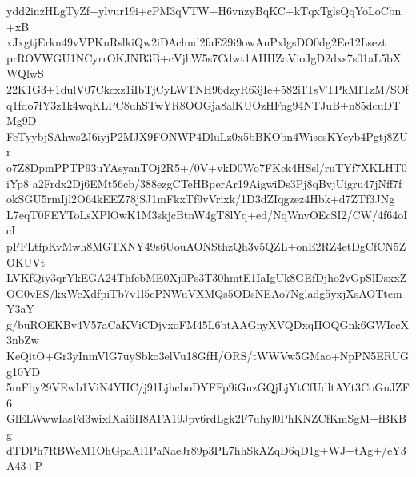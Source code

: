 ydd2inzHLgTyZf+ylvur19i+cPM3qVTW+H6vnzyBqKC+kTqxTglsQqYoLoCbn+xB
xJxgtjErkn49vVPKuRslkiQw2iDAchnd2faE29i9owAnPxlgsDO0dg2Ee12Lsezt
prROVWGU1NCyrrOKJNB3B+cVjhW5s7Cdwt1AHHZaVioJgD2dxs7s01aL5bXWQlwS
22K1G3+1dulV07Ckcxz1iIbTjCyLWTNH96dzyR63jIe+582i1TsVTPkMITzM/SOf
q1fdo7fY3z1k4wqKLPC8uhSTwYR8OOGja8alKUOzHFng94NTJuB+n85dcuDTMg9D
FcTyybjSAhws2J6iyjP2MJX9FONWP4DluLz0x5bBKObn4WisesKYcyb4Pgtj8ZUr
o7Z8DpmPPTP93uYAsyanTOj2R5+/0V+vkD0Wo7FKck4HSsl/ruTYf7XKLHT0iYp8
a2Frdx2Dj6EMt56cb/388ezgCTeHBperAr19AigwiDs3Pj8qBvjUigru47jNff7f
okSGU5rmIjl2O64kEEZ78jSJ1mFkxTf9vVrixk/1D3dZIqgzez4Hbk+d7ZTf3JNg
L7eqT0FEYToLsXPlOwK1M3skjcBtnW4gT8lYq+ed/NqWnvOEcSI2/CW/4f64oIcI
pFFLtfpKvMwh8MGTXNY49s6UouAONSthzQh3v5QZL+onE2RZ4etDgCfCN5ZOKUVt
LVKfQiy3qrYkEGA24ThfcbME0Xj0Ps3T30hmtE1IaIgUk8GEfDjho2vGpSlDsxxZ
OG0vES/kxWeXdfpiTb7v1l5cPNWuVXMQs5ODsNEAo7Ngladg5yxjXsAOTtcmY3aY
g/buROEKBv4V57aCaKViCDjvxoFM45L6btAAGnyXVQDxqIIOQGnk6GWIccX3nbZw
KeQitO+Gr3yInmVlG7uySbko3elVu18GfH/ORS/tWWVw5GMao+NpPN5ERUGg10YD
5mFby29VEwb1ViN4YHC/j91LjhcboDYFFp9iGuzGQjLjYtCfUdltAYt3CoGuJZF6
GlELWwwIasFd3wixIXai6II8AFA19Jpv6rdLgk2F7uhyl0PhKNZCfKmSgM+fBKBg
dTDPh7RBWeM1OhGpaAl1PaNaeJr89p3PL7hhSkAZqD6qD1g+WJ+tAg+/eY3A43+P
